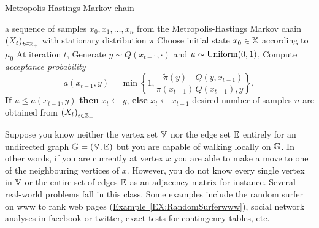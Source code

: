 \begin{algorithm}%
\caption{Metropolis-Hastings Markov chain}
\label{A:MHSamplerFiniteMC}
\begin{algorithmic}[1]
 a sequence of samples $x_0,x_1, \ldots, x_n$ from the Metropolis-Hastings Markov chain $\left(X_t\right)_{t \in \mathbb{Z}_+}$ with stationary distribution $\pi$
\STATE Choose initial state $x_0 \in \mathbb{X}$ according to $\mu_0$
\REPEAT
\STATE At iteration $t$,
\STATE Generate $y \sim Q(x_{t-1},\cdot)$ and $u \sim \mbox{{\rm Uniform}}(0,1)$,
\STATE Compute {\it acceptance probability}
\[
a(x_{t-1},y)=\min\left\{1,\frac{\tilde{\pi}(y)}{\tilde{\pi}(x_{t-1})}\frac{Q(y,x_{t-1})}{Q(x_{t-1}),y} \right\},
\]
\STATE
{\bf If} $u \leq a(x_{t-1},y)$
{\bf then} $x_t \gets y$, 
{\bf else} $x_t \gets x_{t-1}$
\UNTIL desired number of samples $n$ are obtained from $\left(X_t\right)_{t \in \mathbb{Z}_+}$
\end{algorithmic}
\end{algorithm}

Suppose you know neither the vertex set $\mathbb{V}$ nor the edge set $\mathbb{E}$ entirely for an undirected graph $\mathbb{G}=(\mathbb{V},\mathbb{E})$ but you are capable of walking locally on $\mathbb{G}$.  
In other words, if you are currently at vertex $x$ you are able to make a move to one of the neighbouring vertices of $x$.  
However, you do not know every single vertex in $\mathbb{V}$ or the entire set of edges $\mathbb{E}$ as an adjacency matrix for instance.  
Several real-world problems fall in this class.  
Some examples include the random surfer on www to rank web pages (\hyperref[EX:RandomSurferwww]{Example~\ref*{EX:RandomSurferwww}}), social network analyses in facebook or twitter, exact tests for contingency tables, etc.

